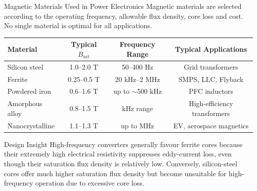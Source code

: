 \begin{frame}{Magnetic Materials Used in Power Electronics}
Magnetic materials are selected according to the operating frequency, allowable flux density, core loss and cost. No single material is optimal for all applications.
\begin{table}
\centering
\footnotesize
\begin{tabular}{lccc}
\toprule
Material & Typical $B_{\mathrm{sat}}$ & Frequency Range & Typical Applications\\
\midrule
Silicon steel & 1.0--2.0 T & 50--400 Hz & Grid transformers\\
Ferrite & 0.25--0.5 T & 20 kHz--2 MHz & SMPS, LLC, Flyback\\
Powdered iron & 0.6--1.6 T & up to $\sim$500 kHz & PFC inductors\\
Amorphous alloy & 0.8--1.5 T & kHz range & High-efficiency transformers\\
Nanocrystalline & 1.1--1.3 T & up to MHz & EV, aerospace magnetics\\
\bottomrule
\end{tabular}
\end{table}

\begin{block}{Design Insight}
High-frequency converters generally favour ferrite cores because their extremely high electrical resistivity suppresses eddy-current loss, even though their saturation flux density is relatively low. Conversely, silicon-steel cores offer much higher saturation flux density but become unsuitable
for high-frequency operation due to excessive core loss.
\end{block}
\end{frame}

